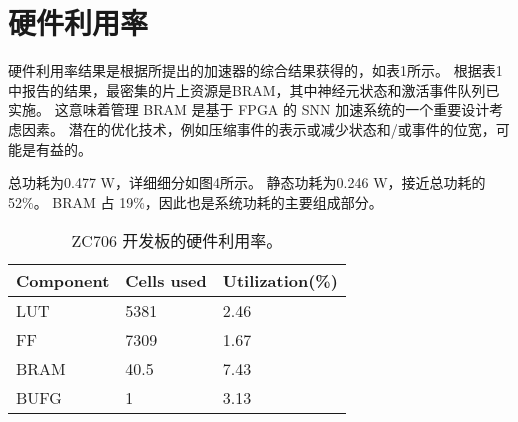 



\section{硬件利用率}

硬件利用率结果是根据所提出的加速器的综合结果获得的，如表1所示。
根据表1中报告的结果，最密集的片上资源是BRAM，其中神经元状态和激活事件队列已实施。 
这意味着管理 BRAM 是基于 FPGA 的 SNN 加速系统的一个重要设计考虑因素。
潜在的优化技术，例如压缩事件的表示或减少状态和/或事件的位宽，可能是有益的。

总功耗为0.477 W，详细细分如图4所示。
静态功耗为0.246 W，接近总功耗的52\%。
BRAM 占 19\%，因此也是系统功耗的主要组成部分。

\begin{table}[!hpt]
    \caption{ZC706 开发板的硬件利用率。}
    \centering
    \begin{tabular}{@{}lll@{}}
    \toprule
    Component & Cells used & Utilization(\%) \\ \midrule
    LUT       & 5381       & 2.46            \\
    FF        & 7309       & 1.67            \\
    BRAM      & 40.5       & 7.43            \\
    BUFG      & 1          & 3.13            \\ \midrule
    \end{tabular}
\end{table}

